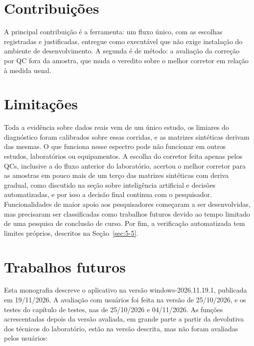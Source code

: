 \section{Contribuições}

A principal contribuição é a ferramenta: um fluxo único, com as escolhas registradas e justificadas, entregue como executável que não exige instalação do ambiente de desenvolvimento. A segunda é de método: a avaliação da correção por QC fora da amostra, que muda o veredito sobre o melhor corretor em relação à medida usual.

\section{Limitações}

Toda a evidência sobre dados reais vem de um único estudo, os limiares do diagnóstico foram calibrados sobre essas corridas, e as matrizes sintéticas derivam das mesmas. O que funciona nesse espectro pode não funcionar em outros estudos, laboratórios ou equipamentos. A escolha do corretor feita apenas pelos QCs, inclusive a do fluxo anterior do laboratório, acertou o melhor corretor para as amostras em pouco mais de um terço das matrizes sintéticas com deriva gradual, como discutido na seção sobre inteligência artificial e decisões automatizadas, e por isso a decisão final continua com o pesquisador. Funcionalidades de maior apoio aos pesquisadores começaram a ser desenvolvidas, mas precisaram ser classificadas como trabalhos futuros devido ao tempo limitado de uma pesquisa de conclusão de curso. Por fim, a verificação automatizada tem limites próprios, descritos na Seção~\ref{sec:5-5}.

\section{Trabalhos futuros}

Esta monografia descreve o aplicativo na versão windows-2026.11.19.1, publicada em 19/11/2026. A avaliação com usuários foi feita na versão de 25/10/2026, e os testes do capítulo de testes, nas de 25/10/2026 e 04/11/2026. As funções acrescentadas depois da versão avaliada, em grande parte a partir da devolutiva dos técnicos do laboratório, estão na versão descrita, mas não foram avaliadas pelos usuários: 

